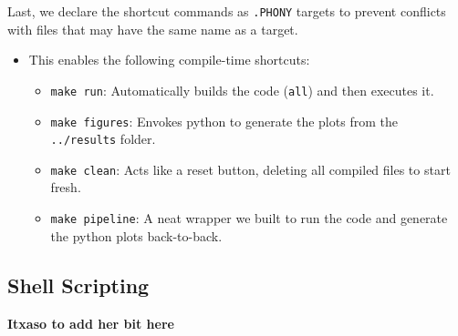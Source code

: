 \documentclass[
]{article}
\newenvironment{Shaded}{}{}
\newcommand{\CharTok}[1]{\textcolor[rgb]{0.25,0.44,0.63}{#1}}
\newcommand{\DataTypeTok}[1]{\textcolor[rgb]{0.56,0.13,0.00}{#1}}
\newcommand{\DecValTok}[1]{\textcolor[rgb]{0.25,0.63,0.44}{#1}}
\newcommand{\ErrorTok}[1]{\textcolor[rgb]{1.00,0.00,0.00}{\textbf{#1}}}
\newcommand{\FunctionTok}[1]{\textcolor[rgb]{0.02,0.16,0.49}{#1}}
\newcommand{\NormalTok}[1]{#1}
\newcommand{\OtherTok}[1]{\textcolor[rgb]{0.00,0.44,0.13}{#1}}
\providecommand{\tightlist}{%
  \setlength{\itemsep}{0pt}\setlength{\parskip}{0pt}}
\begin{document}
Last, we declare the shortcut commands as \texttt{.PHONY} targets to
prevent conflicts with files that may have the same name as a target.

\begin{Shaded}
\end{Shaded}

\begin{itemize}
\tightlist
\item
  This enables the following compile-time shortcuts:

  \begin{itemize}
  \tightlist
  \item
    \texttt{make\ run}: Automatically builds the code (\texttt{all}) and
    then executes it.
  \item
    \texttt{make\ figures}: Envokes python to generate the plots from
    the \texttt{../results} folder.
  \item
    \texttt{make\ clean}: Acts like a reset button, deleting all
    compiled files to start fresh.
  \item
    \texttt{make\ pipeline}: A neat wrapper we built to run the code and
    generate the python plots back-to-back.
  \end{itemize}
\end{itemize}

\subsection{Shell Scripting}\label{shell-scripting}

\textbf{Itxaso to add her bit here}
\end{document}
